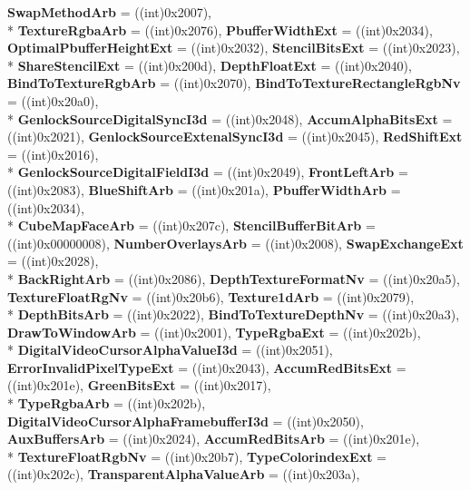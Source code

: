 \begin{DoxyCompactItemize}
{\bfseries Swap\-Method\-Arb} = ((int)0x2007), 
\\*
{\bfseries Texture\-Rgba\-Arb} = ((int)0x2076), 
{\bfseries Pbuffer\-Width\-Ext} = ((int)0x2034), 
{\bfseries Optimal\-Pbuffer\-Height\-Ext} = ((int)0x2032), 
{\bfseries Stencil\-Bits\-Ext} = ((int)0x2023), 
\\*
{\bfseries Share\-Stencil\-Ext} = ((int)0x200d), 
{\bfseries Depth\-Float\-Ext} = ((int)0x2040), 
{\bfseries Bind\-To\-Texture\-Rgb\-Arb} = ((int)0x2070), 
{\bfseries Bind\-To\-Texture\-Rectangle\-Rgb\-Nv} = ((int)0x20a0), 
\\*
{\bfseries Genlock\-Source\-Digital\-Sync\-I3d} = ((int)0x2048), 
{\bfseries Accum\-Alpha\-Bits\-Ext} = ((int)0x2021), 
{\bfseries Genlock\-Source\-Extenal\-Sync\-I3d} = ((int)0x2045), 
{\bfseries Red\-Shift\-Ext} = ((int)0x2016), 
\\*
{\bfseries Genlock\-Source\-Digital\-Field\-I3d} = ((int)0x2049), 
{\bfseries Front\-Left\-Arb} = ((int)0x2083), 
{\bfseries Blue\-Shift\-Arb} = ((int)0x201a), 
{\bfseries Pbuffer\-Width\-Arb} = ((int)0x2034), 
\\*
{\bfseries Cube\-Map\-Face\-Arb} = ((int)0x207c), 
{\bfseries Stencil\-Buffer\-Bit\-Arb} = ((int)0x00000008), 
{\bfseries Number\-Overlays\-Arb} = ((int)0x2008), 
{\bfseries Swap\-Exchange\-Ext} = ((int)0x2028), 
\\*
{\bfseries Back\-Right\-Arb} = ((int)0x2086), 
{\bfseries Depth\-Texture\-Format\-Nv} = ((int)0x20a5), 
{\bfseries Texture\-Float\-Rg\-Nv} = ((int)0x20b6), 
{\bfseries Texture1d\-Arb} = ((int)0x2079), 
\\*
{\bfseries Depth\-Bits\-Arb} = ((int)0x2022), 
{\bfseries Bind\-To\-Texture\-Depth\-Nv} = ((int)0x20a3), 
{\bfseries Draw\-To\-Window\-Arb} = ((int)0x2001), 
{\bfseries Type\-Rgba\-Ext} = ((int)0x202b), 
\\*
{\bfseries Digital\-Video\-Cursor\-Alpha\-Value\-I3d} = ((int)0x2051), 
{\bfseries Error\-Invalid\-Pixel\-Type\-Ext} = ((int)0x2043), 
{\bfseries Accum\-Red\-Bits\-Ext} = ((int)0x201e), 
{\bfseries Green\-Bits\-Ext} = ((int)0x2017), 
\\*
{\bfseries Type\-Rgba\-Arb} = ((int)0x202b), 
{\bfseries Digital\-Video\-Cursor\-Alpha\-Framebuffer\-I3d} = ((int)0x2050), 
{\bfseries Aux\-Buffers\-Arb} = ((int)0x2024), 
{\bfseries Accum\-Red\-Bits\-Arb} = ((int)0x201e), 
\\*
{\bfseries Texture\-Float\-Rgb\-Nv} = ((int)0x20b7), 
{\bfseries Type\-Colorindex\-Ext} = ((int)0x202c), 
{\bfseries Transparent\-Alpha\-Value\-Arb} = ((int)0x203a), 

\end{DoxyCompactItemize}
